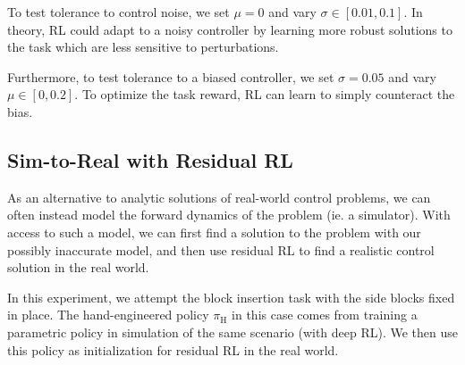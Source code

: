 To test tolerance to control noise, we set $\mu = 0$ and vary $\sigma \in [0.01, 0.1]$. In theory, RL could adapt to a noisy controller by learning more robust solutions to the task which are less sensitive to perturbations.

Furthermore, to test tolerance to a biased controller, we set $\sigma = 0.05$ and vary $\mu \in [0, 0.2]$. To optimize the task reward, RL can learn to simply counteract the bias. 

\subsection{Sim-to-Real with Residual RL}

As an alternative to analytic solutions of real-world control problems, we can often instead model the forward dynamics of the problem (ie. a simulator). With access to such a model, we can first find a solution to the problem with our possibly inaccurate model, and then use residual RL to find a realistic control solution in the real world.

In this experiment, we attempt the block insertion task with the side blocks fixed in place. The hand-engineered policy $\pi_\text{H}$ in this case comes from training a parametric policy in simulation of the same scenario (with deep RL). We then use this policy as initialization for residual RL in the real world.